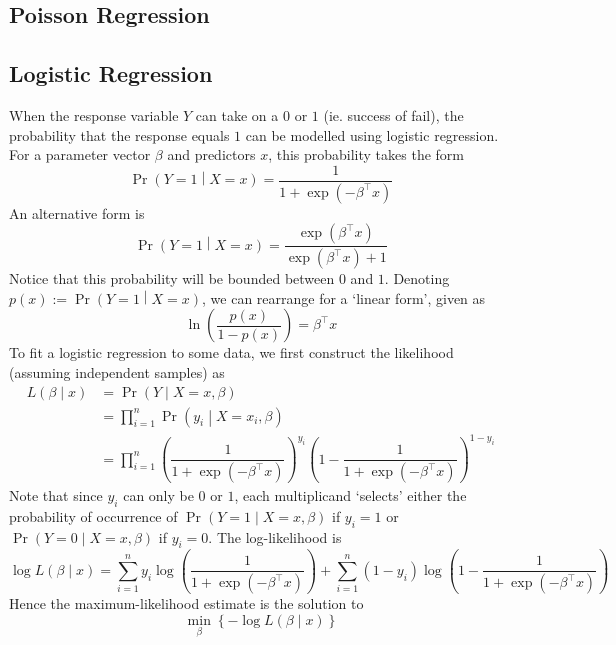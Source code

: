 \documentclass[11pt]{report} %
\begin{document}
\subsection{Poisson Regression}

\subsection{Logistic Regression}

When the response variable $Y$ can take on a $0$ or $1$ (ie. success of fail), the probability that the response equals $1$ can be modelled using logistic regression. For a parameter vector $\beta$ and predictors $x$, this probability takes the form
\begin{equation}
\operatorname{Pr}\left(Y = 1\middle| X = x\right) = \dfrac{1}{1 + \exp\left(-\beta^{\top}x\right)}
\end{equation}
An alternative form is
\begin{equation}
\operatorname{Pr}\left(Y = 1\middle| X = x\right) = \dfrac{\exp\left(\beta^{\top}x\right)}{\exp\left(\beta^{\top}x\right) + 1}
\end{equation}
Notice that this probability will be bounded between $0$ and $1$. Denoting $p\left(x\right) := \operatorname{Pr}\left(Y = 1\middle| X = x\right)$, we can rearrange for a `linear form', given as
\begin{equation}
\ln\left(\dfrac{p\left(x\right)}{1 - p\left(x\right)}\right) = \beta^{\top}x
\end{equation}
To fit a logistic regression to some data, we first construct the likelihood (assuming independent samples) as
\begin{align}
L\left(\beta\middle|x\right) &= \operatorname{Pr}\left(Y\middle|X = x, \beta\right) \\
&= \prod_{i = 1}^{n} \operatorname{Pr}\left(y_{i}\middle|X = x_{i}, \beta\right) \\
&= \prod_{i = 1}^{n} \left(\dfrac{1}{1 + \exp\left(-\beta^{\top}x\right)}\right)^{y_{i}}\left(1 - \dfrac{1}{1 + \exp\left(-\beta^{\top}x\right)}\right)^{1 - y_{i}}
\end{align}
Note that since $y_{i}$ can only be $0$ or $1$, each multiplicand `selects' either the probability of occurrence of $\operatorname{Pr}\left(Y = 1\middle|X = x, \beta\right)$ if $y_{i} = 1$ or $\operatorname{Pr}\left(Y = 0\middle|X = x, \beta\right)$ if $y_{i} = 0$. The log-likelihood is
\begin{equation}
\log L\left(\beta\middle|x\right) = \sum_{i = 1}^{n} y_{i}\log\left(\dfrac{1}{1 + \exp\left(-\beta^{\top}x\right)}\right) + \sum_{i = 1}^{n}\left(1 - y_{i}\right)\log\left(1 - \dfrac{1}{1 + \exp\left(-\beta^{\top}x\right)}\right)
\end{equation}
Hence the maximum-likelihood estimate is the solution to
\begin{equation}
\min_{\beta} \left\{-\log L\left(\beta\middle|x\right)\right\}
\end{equation}
\end{document}
